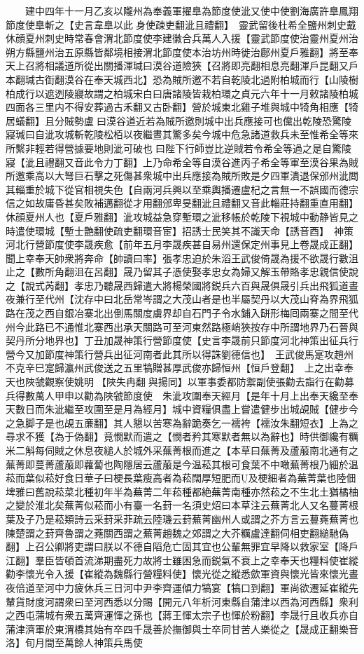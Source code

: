 　　建中四年十一月乙亥以隴州為奉義軍擢臯為節度使泚又使中使劉海廣許臯鳳翔節度使臯斬之【史言韋臯以此身使疎吏翻泚且禮翻】　靈武留後杜希全鹽州刺史戴休顔夏州刺史時常春會渭北節度使李建徽合兵萬人入援【靈武節度使治靈州夏州治朔方縣鹽州治五原縣皆鄰境相接渭北節度使本治坊州時徙治鄜州夏戶雅翻】將至奉天上召將相議道所從出關播渾瑊曰漠谷道險狹【召將即亮翻相息亮翻渾戶昆翻又戶本翻瑊古衘翻漠谷在奉天城西北】恐為賊所邀不若自乾陵北過附柏城而行【山陵樹柏成行以遮迾陵寢故謂之柏城宋白曰唐諸陵皆栽柏環之貞元六年十一月敕諸陵柏城四面各三里内不得安葬過古禾翻又古卧翻】營於城東北雞子堆與城中犄角相應【犄居蟻翻】且分賊勢盧曰漠谷道近若為賊所邀則城中出兵應接可也儻出乾陵恐驚陵寢瑊曰自泚攻城斬乾陵松栢以夜繼晝其驚多矣今城中危急諸道救兵未至惟希全等來所繫非輕若得營據要地則泚可破也曰陛下行師豈比逆賊若令希全等過之是自驚陵寢【泚且禮翻又音此令力丁翻】上乃命希全等自漠谷進丙子希全等軍至漠谷果為賊所邀乘高以大弩巨石擊之死傷甚衆城中出兵應接為賊所敗是夕四軍潰退保邠州泚閲其輜重於城下從官相視失色【自兩河兵興以至乘輿播遷盧杞之言無一不誤國而德宗信之如故庸昏甚矣敗補邁翻從才用翻邠卑旻翻泚且禮翻又音此輜莊持翻重直用翻】休顔夏州人也【夏戶雅翻】泚攻城益急穿塹環之泚移帳於乾陵下視城中動静皆見之時遣使環城【塹士艶翻使疏吏翻環音宦】招誘士民笑其不識天命【誘音酉】　神策河北行營節度使李晟疾愈【前年五月李晟疾甚自易州還保定州事見上卷晟成正翻】聞上幸奉天帥衆將奔命【帥讀曰率】張孝忠迫於朱滔王武俊倚晟為援不欲晟行數沮止之【數所角翻沮在呂翻】晟乃留其子憑使娶孝忠女為婦又解玉帶賂孝忠親信使說之【說式芮翻】孝忠乃聽晟西歸遣大將楊榮國將鋭兵六百與晟俱晟引兵出飛狐道晝夜兼行至代州【沈存中曰北岳常岑謂之大茂山者是也半屬契丹以大茂山脊為界飛狐路在茂之西自銀冶寨北出倒馬關度虜界却自石門子令水鋪入缾形梅囘兩寨之間至代州今此路已不通惟北寨西出承天關路可至河東然路極峭狹按存中所謂地界乃石晉與契丹所分地界也】丁丑加晟神策行營節度使【史言李晟前只節度河北神策出征兵行營今又加節度神策行營兵出征河南者此其所以得誅劉德信也】　王武俊馬寔攻趙州不克辛巳寔歸瀛州武俊送之五里犒贈甚厚武俊亦歸恒州【恒戶登翻】　上之出幸奉天也陜虢觀察使姚明【陜失冉翻與揚同】以軍事委都防禦副使張勸去詣行在勸募兵得數萬人甲申以勸為陜虢節度使　朱泚攻圍奉天經月【是年十月上出奉天纔至奉天數日而朱泚繼至攻圍至是月為經月】城中資糧俱盡上嘗遣健步出城覘賊【健步今之急脚子是也覘五亷翻】其人懇以苦寒為辭跪奏乞一襦袴【襦汝朱翻短衣】上為之尋求不獲【為于偽翻】竟憫默而遣之【憫者矜其寒默者無以為辭也】時供御纔有糲米二斛每伺賊之休息夜縋人於城外采蕪菁根而進之【本草曰蕪菁及蘆菔南北通有之蕪菁即蔓菁蘆菔即蘿蔔也陶隱居云蘆菔是今温菘其根可食葉不中噉蕪菁根乃細於温菘而葉似菘好食日華子曰梗長葉瘦高者為菘闊厚短肥而及梗細者為蕪菁葉也陸佃埤雅曰舊說菘菜北種初年半為蕪菁二年菘種都絶蕪菁南種亦然菘之不生北土猶橘柚之變於淮北矣蕪菁似菘而小有臺一名葑一名須史炤曰本草注云蕪菁北人又名蔓菁根葉及子乃是菘類詩云采葑采菲疏云陸璣云葑蕪菁幽州人或謂之芥方言云蘴蕘蕪菁也陳楚謂之葑齊魯謂之蕘關西謂之蕪菁趙魏之郊謂之大芥糲盧達翻伺相吏翻縋馳偽翻】上召公卿將吏謂曰朕以不德自䧟危亡固其宜也公輩無罪宜早降以救家室【降戶江翻】羣臣皆頓首流涕期盡死力故將士雖困急而鋭氣不衰上之幸奉天也糧料使崔縱勸李懷光令入援【崔縱為魏縣行營糧料使】懷光從之縱悉歛軍資與懷光皆來懷光晝夜倍道至河中力疲休兵三日河中尹李齊運傾力犒宴【犒口到翻】軍尚欲遷延崔縱先輦貨財度河謂衆曰至河西悉以分賜【開元八年析河東縣自蒲津以西為河西縣】衆利之西屯蒲城有衆五萬齊運惲之孫也【蔣王惲太宗子也惲於粉翻】李晟行且收兵亦自蒲津濟軍於東渭橋其始有卒四千晟善於撫御與士卒同甘苦人樂從之【晟成正翻樂音洛】旬月間至萬餘人神策兵馬使